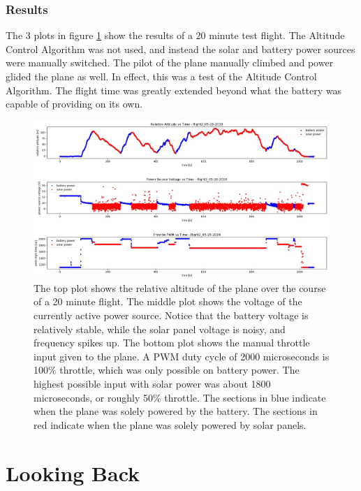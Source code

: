 \documentclass[12pt,journal,compsoc]{IEEEtran}
\begin{document}
\subsubsection{Results}
The 3 plots in figure \ref{flight_altitude_voltage_pwm_plot} show the results of a 20 minute test flight. The Altitude Control Algorithm was not used, and instead the solar and battery power sources were manually switched. The pilot of the plane manually climbed and power glided the plane as well. In effect, this was a test of the Altitude Control Algorithm. The flight time was greatly extended beyond what the battery was capable of providing on its own.

\begin{figure}[h!]
\hspace*{0cm}
\centering
\includegraphics[width=\textwidth]{alt_vs_time_flight2_05-28-2019.jpg}
\caption{The top plot shows the relative altitude of the plane over the course of a 20 minute flight. The middle plot shows the voltage of the currently active power source. Notice that the battery voltage is relatively stable, while the solar panel voltage is noisy, and frequency spikes up. The bottom plot shows the manual throttle input given to the plane. A PWM duty cycle of 2000 microseconds is 100\% throttle, which was only possible on battery power. The highest possible input with solar power was about 1800 microseconds, or roughly 50\% throttle. The sections in blue indicate when the plane was solely powered by the battery. The sections in red indicate when the plane was solely powered by solar panels. }
\label{flight_altitude_voltage_pwm_plot}
\end{figure}

\section{Looking Back}
\end{document}
